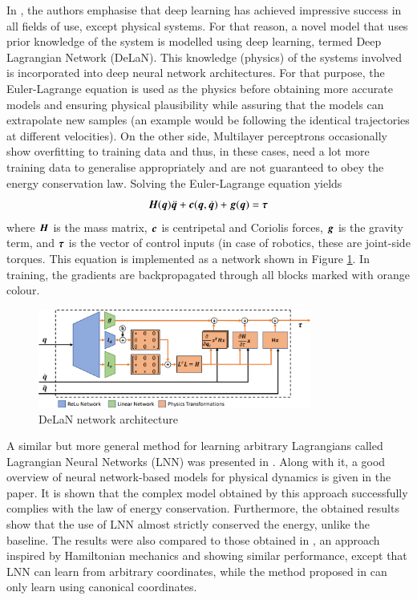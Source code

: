 In \cite{Lutter2019, Lutter2019a}, the authors emphasise that deep learning has achieved impressive success in all fields of use, except physical systems. For that reason, a novel model that uses prior knowledge of the system is modelled using deep learning, termed Deep Lagrangian Network (DeLaN). This knowledge (physics) of the systems involved is incorporated into deep neural network architectures. For that purpose, the Euler-Lagrange equation is used as the physics before obtaining more accurate models and ensuring physical plausibility while assuring that the models can extrapolate new samples (an example would be following the identical trajectories at different velocities). On the other side, Multilayer perceptrons occasionally show overfitting to training data and thus, in these cases, need a lot more training data to generalise appropriately and are not guaranteed to obey the energy conservation law. Solving the Euler-Lagrange equation yields
\[
    {\bm{H}}({\bm{q}})\ddot{{\bm{q}}} + {\bm{c}}({\bm{q}},\dot{{\bm{q}}}) + {\bm{g}}({\bm{q}}) = {\bm{\tau}}
\]
where ${\bm{H}}$ is the mass matrix, ${\bm{c}}$ is centripetal and Coriolis forces, ${\bm{g}}$ is the gravity term, and ${\bm{\tau}}$ is the vector of control inputs (in case of robotics, these are joint-side torques. This equation is implemented as a network shown in Figure \ref{fig:DeLaN}. In training, the gradients are backpropagated through all blocks marked with orange colour.

\begin{figure}
    \centering
    \includegraphics[width=0.8\textwidth]{slike/delan.png}
    \caption[DeLaN network architecture]{DeLaN network architecture \cite{Lutter2019}}
    \label{fig:DeLaN}
\end{figure}

A similar but more general method for learning arbitrary Lagrangians called Lagrangian Neural Networks (LNN) was presented in \cite{Cranmer2020}. Along with it, a good overview of neural network-based models for physical dynamics is given in the paper. It is shown that the complex model obtained by this approach successfully complies with the law of energy conservation. Furthermore, the obtained results show that the use of LNN almost strictly conserved the energy, unlike the baseline. The results were also compared to those obtained in \cite{Greydanus2019}, an approach inspired by Hamiltonian mechanics and showing similar performance, except that LNN can learn from arbitrary coordinates, while the method proposed in \cite{Greydanus2019} can only learn using canonical coordinates.

